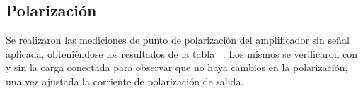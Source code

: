 \subsection{Polarización}

\par Se realizaron las mediciones de punto de polarización del amplificador sin señal aplicada, obteniéndose los resultados de la tabla ~. Los mismos se verificaron con y sin la carga conectada para observar que no haya cambios en la polarización, una vez ajustada la corriente de polarización de salida.


